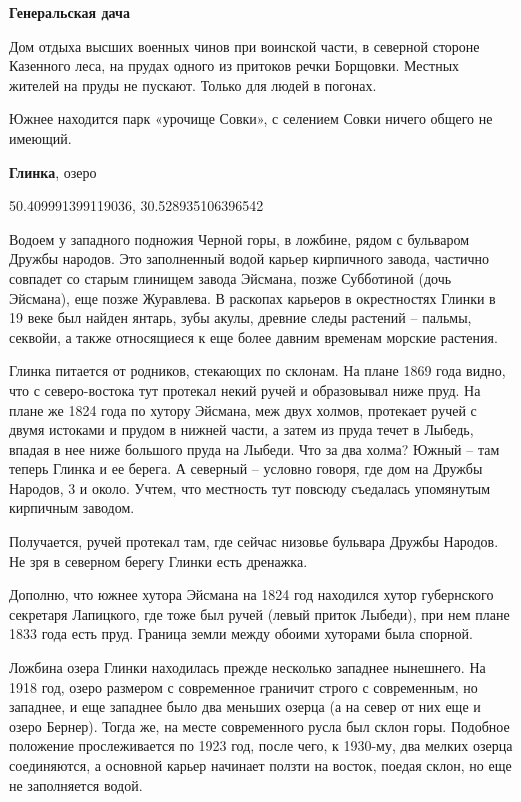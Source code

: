 \textbf{Генеральская дача} 


Дом отдыха высших военных чинов при воинской части, в северной стороне Казенного леса, на прудах одного из притоков речки Борщовки. Местных жителей на пруды не пускают. Только для людей в погонах.

Южнее находится парк «урочище Совки», с селением Совки ничего общего не имеющий.\\

\medskip

\textbf{Глинка}, озеро

50.409991399119036, 30.528935106396542

Водоем у западного подножия Черной горы, в ложбине, рядом с бульваром Дружбы народов. Это заполненный водой карьер кирпичного завода, частично совпадет со старым глинищем завода Эйсмана, позже Субботиной (дочь Эйсмана), еще позже Журавлева. В раскопах карьеров в окрестностях Глинки в 19 веке был найден янтарь, зубы акулы, древние следы растений – пальмы, секвойи, а также относящиеся к еще более давним временам морские растения. 

Глинка питается от родников, стекающих по склонам. На плане 1869 года видно, что с северо-востока тут протекал некий ручей и образовывал ниже пруд. На плане же 1824 года по хутору Эйсмана, меж двух холмов, протекает ручей с двумя истоками и прудом в нижней части, а затем из пруда течет в Лыбедь, впадая в нее ниже большого пруда на Лыбеди. Что за два холма? Южный – там теперь Глинка и ее берега. А северный – условно говоря, где дом на Дружбы Народов, 3 и около. Учтем, что местность тут повсюду съедалась упомянутым кирпичным заводом.

Получается, ручей протекал там, где сейчас низовье бульвара Дружбы Народов. Не зря в северном берегу Глинки есть дренажка.

Дополню, что южнее хутора Эйсмана на 1824 год находился хутор губернского секретаря Лапицкого, где тоже был ручей (левый приток Лыбеди), при нем плане 1833 года есть пруд. Граница земли между обоими хуторами была спорной.

Ложбина озера Глинки находилась прежде несколько западнее нынешнего. На 1918 год, озеро размером с современное граничит строго с современным, но западнее, и еще западнее было два меньших озерца (а на север от них еще и озеро Бернер). Тогда же, на месте современного русла был склон горы. Подобное положение прослеживается по 1923 год, после чего, к 1930-му, два мелких озерца соединяются, а основной карьер начинает ползти на восток, поедая склон, но еще не заполняется водой.

